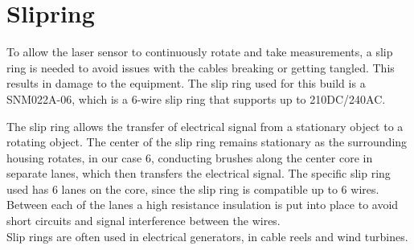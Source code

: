\clearpage
\section{Slipring}

To allow the laser sensor to continuously rotate and take measurements, a slip ring is needed to avoid issues with the cables breaking or getting tangled. This results in damage to the equipment. 
The slip ring used for this build is a SNM022A-06\cite{slipring}, which is a 6-wire slip ring that supports up to 210DC/240AC. 

The slip ring allows the transfer of electrical signal from a stationary object to a rotating object. The center of the slip ring remains stationary as the surrounding housing rotates, in our case 6, conducting brushes along the center core in separate lanes, which then transfers the electrical signal.
The specific slip ring used has 6 lanes on the core, since the slip ring is compatible up to 6 wires. Between each of the lanes a high resistance insulation is put into place to avoid short circuits and signal interference between the wires.\cite{slipringhow} \\
Slip rings are often used in electrical generators, in cable reels and wind turbines.

